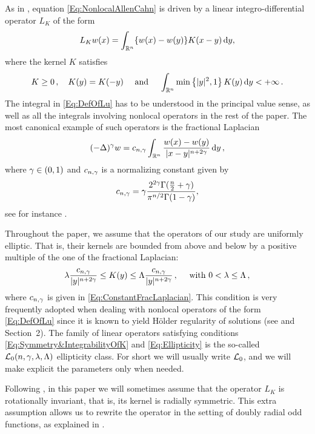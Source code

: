  
As in \cite{FelipeSanz-Perela:IntegroDifferentialI}, equation \eqref{Eq:NonlocalAllenCahn} is driven by a linear integro-differential operator $L_K$ of the form
\begin{equation}
\label{Eq:DefOfLu}
L_K w(x) = \int_{\mathbb{R}^n} \{w(x) - w(y)\} K(x-y)\,\mathrm{d} y,
\end{equation}
where the kernel $K$ satisfies
\begin{equation}
\label{Eq:Symmetry&IntegrabilityOfK}
K\geq 0\,, \quad K(y) = K(-y) \quad \textrm{ and } \quad \int_{\mathbb{R}^n} \min \left\{ |y|^2, 1 \right\} K(y) \,\mathrm{d} y < + \infty\,.
\end{equation}
The integral in \eqref{Eq:DefOfLu} has to be understood in the principal value sense, as well as all the integrals involving nonlocal operators in the rest of the paper.
The most canonical example of such operators is the fractional Laplacian
$$
(-\Delta)^\gamma w = c_{n, \gamma} \int_{\mathbb{R}^n} \dfrac{w(x) - w(y)}{|x-y|^{n + 2\gamma}}\,\mathrm{d} y\,,
$$
where $\gamma \in (0,1)$ and $c_{n, \gamma}$ is a normalizing constant given by
\begin{equation}
  \label{Eq:ConstantFracLaplacian}
  c_{n,\gamma} = \gamma\dfrac{2^{2\gamma} \Gamma(\frac{n}{2}+\gamma) }{\pi^{n/2} \Gamma(1-\gamma)},
\end{equation}
see for instance \cite{BucurValdinoci}.

Throughout the paper, we assume that the operators of our study are uniformly elliptic. That is, their kernels are bounded from above and below by a positive multiple of the one of the fractional Laplacian:
\begin{equation}
\label{Eq:Ellipticity}
\lambda \dfrac{c_{n,\gamma}}{|y|^{n+2\gamma}} \leq K(y) \leq \Lambda\dfrac{c_{n,\gamma}}{|y|^{n+2\gamma}}\,, \quad \text{ with }  0< \lambda \leq \Lambda \,,
\end{equation}
where $c_{n,\gamma}$ is given in \eqref{Eq:ConstantFracLaplacian}. This condition is very frequently adopted when dealing with nonlocal operators of the form \eqref{Eq:DefOfLu} since it is known to yield Hölder regularity of solutions (see \cite{RosOton-Survey,SerraC2s+alphaRegularity} and Section~2). The family of linear operators satisfying conditions \eqref{Eq:Symmetry&IntegrabilityOfK} and \eqref{Eq:Ellipticity} is the so-called $\mathcal{L}_0(n,\gamma,\lambda, \Lambda)$ ellipticity class. For short we will usually write $\mathcal{L}_0$, and we will make explicit the parameters only when needed.

Following \cite{FelipeSanz-Perela:IntegroDifferentialI}, in this paper we will sometimes assume that the operator $L_K$ is rotationally invariant, that is, its kernel is radially symmetric. This extra assumption allows us to rewrite the operator in the setting of doubly radial odd functions, as explained in \cite{FelipeSanz-Perela:IntegroDifferentialI}.

